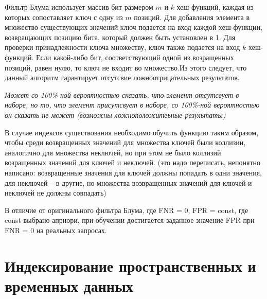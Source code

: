 Фильтр Блума использует массив бит размером $m$ и $k$ хеш-функций, каждая из
которых сопоставляет ключ с одну из $m$ позиций. Для добавления элемента в
множество существующих значений ключ подается на вход каждой хеш-функции,
возвращающих позицию бита, который должен быть установлен в 1. Для проверки
принадлежности ключа множеству, ключ также подается на вход $k$ хеш-функций.
Если какой-либо бит, соответствующий одной из возращенных позиций, равен нулю,
то ключ не входит во множество.Из этого следует, что данный алгоритм гарантирует
отсутсвие ложноотрицательных результатов.

\textit{Может со 100\%-ной вероятностью сказать, что элемент отсутсвует в
наборе, но то, что элемент присутсвует в наборе, со 100\%-ной вероятностью он
сказать не может (возможны ложноположитеьные результаты)}

В случае индексов существования необходимо обучить функцию таким образом, чтобы
среди возвращенных значений для множества ключей были коллизии, аналогично для
множества неключей, но при этом не было коллизий возращенных значений для ключей
и неключей. (это надо переписать, непонятно написано: возвращенные значения для
ключей должны попадать в одни значения, для неключей -- в другие, но множества
возвращенных значений для ключей и неключей не должны совпадать)

В отличие от оригинального фильтра Блума, где FNR = 0, FPR = const, где const
выбрано априори, при обучении достигается заданное значение FPR при FNR = 0 на
реальных запросах.



\section{Индексирование пространственных и временных данных}
